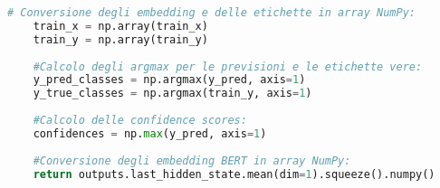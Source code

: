 \begin{lstlisting}[language=Python, caption=Utilizzo di Numpy nel codice]
	# Conversione degli embedding e delle etichette in array NumPy:
	train_x = np.array(train_x)
	train_y = np.array(train_y)
	
	#Calcolo degli argmax per le previsioni e le etichette vere:
	y_pred_classes = np.argmax(y_pred, axis=1)
	y_true_classes = np.argmax(train_y, axis=1)
	
	#Calcolo delle confidence scores:
	confidences = np.max(y_pred, axis=1)
	
	#Conversione degli embedding BERT in array NumPy:
	return outputs.last_hidden_state.mean(dim=1).squeeze().numpy()
\end{lstlisting}